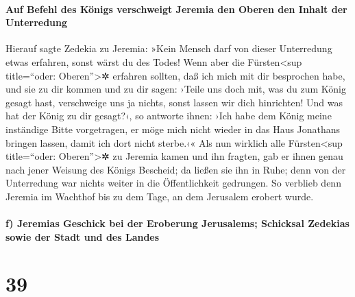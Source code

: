 \hypertarget{auf-befehl-des-kuxf6nigs-verschweigt-jeremia-den-oberen-den-inhalt-der-unterredung}{%
\paragraph{Auf Befehl des Königs verschweigt Jeremia den Oberen den
Inhalt der
Unterredung}\label{auf-befehl-des-kuxf6nigs-verschweigt-jeremia-den-oberen-den-inhalt-der-unterredung}}

Hierauf sagte Zedekia zu Jeremia: »Kein Mensch darf von
dieser Unterredung etwas erfahren, sonst wärst du des Todes!
Wenn aber die Fürsten\textless sup title=``oder:
Oberen''\textgreater✲ erfahren sollten, daß ich mich mit dir besprochen
habe, und sie zu dir kommen und zu dir sagen: ›Teile uns doch mit, was
du zum König gesagt hast, verschweige uns ja nichts, sonst lassen wir
dich hinrichten! Und was hat der König zu dir gesagt?‹,
so antworte ihnen: ›Ich habe dem König meine inständige
Bitte vorgetragen, er möge mich nicht wieder in das Haus Jonathans
bringen lassen, damit ich dort nicht sterbe.‹« Als nun
wirklich alle Fürsten\textless sup title=``oder: Oberen''\textgreater✲
zu Jeremia kamen und ihn fragten, gab er ihnen genau nach jener Weisung
des Königs Bescheid; da ließen sie ihn in Ruhe; denn von der Unterredung
war nichts weiter in die Öffentlichkeit gedrungen. So
verblieb denn Jeremia im Wachthof bis zu dem Tage, an dem Jerusalem
erobert wurde.

\hypertarget{f-jeremias-geschick-bei-der-eroberung-jerusalems-schicksal-zedekias-sowie-der-stadt-und-des-landes}{%
\paragraph{f) Jeremias Geschick bei der Eroberung Jerusalems; Schicksal
Zedekias sowie der Stadt und des
Landes}\label{f-jeremias-geschick-bei-der-eroberung-jerusalems-schicksal-zedekias-sowie-der-stadt-und-des-landes}}

\hypertarget{section-38}{%
\section{39}\label{section-38}}

